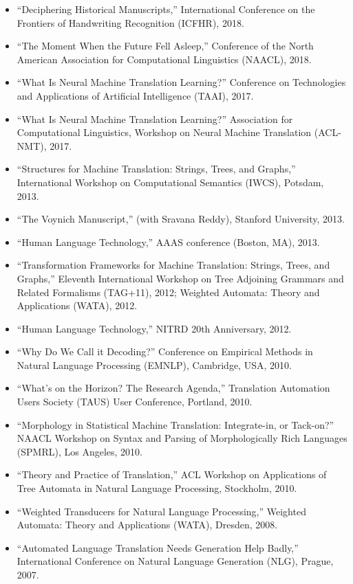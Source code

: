 \pagebreak
{} 

\begin{itemize}
\item ``Deciphering Historical Manuscripts,'' International Conference on the Frontiers of Handwriting Recognition (ICFHR), 2018.
\item ``The Moment When the Future Fell Asleep,'' Conference of the North American Association for Computational Linguistics (NAACL), 2018.
\item ``What Is Neural Machine Translation Learning?'' Conference on Technologies and Applications of Artificial Intelligence (TAAI), 2017.
\item ``What Is Neural Machine Translation Learning?'' Association for Computational Linguistics, Workshop on Neural Machine Translation (ACL-NMT), 2017.
\item ``Structures for Machine Translation: Strings, Trees, and Graphs,'' International Workshop on Computational Semantics (IWCS), Potsdam, 2013.
\item ``The Voynich Manuscript,'' (with Sravana Reddy), Stanford University, 2013.
\item ``Human Language Technology,'' AAAS conference (Boston, MA), 2013.
\item ``Transformation Frameworks for Machine Translation: Strings, Trees, and Graphs,'' Eleventh International Workshop on Tree Adjoining Grammars and Related Formalisms (TAG+11), 2012; Weighted Automata: Theory and Applications (WATA), 2012.
\item ``Human Language Technology,'' NITRD 20th Anniversary, 2012.
\item ``Why Do We Call it Decoding?'' Conference on Empirical Methods in Natural Language Processing (EMNLP), Cambridge, USA, 2010.
\item ``What's on the Horizon?  The Research Agenda,'' Translation Automation Users Society (TAUS) User Conference, Portland, 2010.
\item ``Morphology in Statistical Machine Translation: Integrate-in, or Tack-on?'' NAACL Workshop on Syntax and Parsing of Morphologically Rich Languages (SPMRL), Los Angeles, 2010.
\item ``Theory and Practice of Translation,'' ACL Workshop on Applications of Tree Automata in Natural Language Processing, Stockholm, 2010.
\item ``Weighted Transducers for Natural Language Processing,'' Weighted Automata: Theory and Applications (WATA), Dresden, 2008.
\item ``Automated Language Translation Needs Generation Help Badly,'' International Conference on Natural Language Generation (NLG), Prague, 2007.

\end{itemize}
